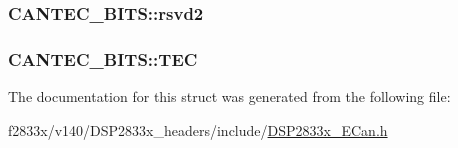 \subsubsection[{rsvd2}]{ C\+A\+N\+T\+E\+C\+\_\+\+B\+I\+T\+S\+::rsvd2}\label{struct_c_a_n_t_e_c___b_i_t_s_af204d5eb7c2cd81ce2e93a2c3814e22b}
\hypertarget{struct_c_a_n_t_e_c___b_i_t_s_a761834b42aab21150ce80d4483fc5e57}{}
\subsubsection[{T\+E\+C}]{ C\+A\+N\+T\+E\+C\+\_\+\+B\+I\+T\+S\+::\+T\+E\+C}\label{struct_c_a_n_t_e_c___b_i_t_s_a761834b42aab21150ce80d4483fc5e57}


The documentation for this struct was generated from the following file\+:\begin{DoxyCompactItemize}
\item 
f2833x/v140/\+D\+S\+P2833x\+\_\+headers/include/\hyperlink{_d_s_p2833x___e_can_8h}{D\+S\+P2833x\+\_\+\+E\+Can.\+h}\end{DoxyCompactItemize}
